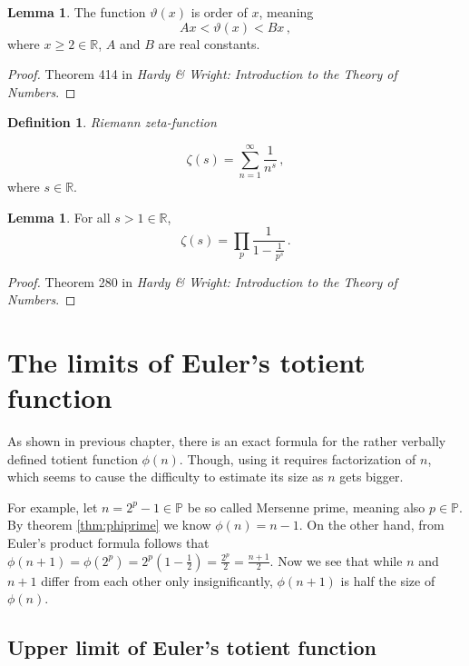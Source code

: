 \documentclass{article}
\theoremstyle{definition}
\newtheorem{definition}[subsubsection]{Definition}
\newtheorem{lemma}[subsubsection]{Lemma}
\begin{document}
\begin{lemma}
\label{lemma:vartheta}
The function $\vartheta(x)$ is order of $x$, meaning
\begin{equation*}
    Ax < \vartheta(x) < Bx\,,
\end{equation*}
where $x\geq2\in\mathbb{R}$, $A$ and $B$ are real constants.

\begin{proof}
Theorem 414 in \textit{Hardy \& Wright: Introduction to the Theory of Numbers}.
\end{proof}
\end{lemma}

\begin{definition}{\emph{Riemann zeta-function}}

\begin{equation*}
    \zeta(s)=\sum_{n=1}^\infty \frac{1}{n^s}\,,
\end{equation*}
where $s\in\mathbb{R}$.
\end{definition}

\begin{lemma}
For all $s>1\in\mathbb{R}$, 
\begin{equation*}
    \zeta(s)=\prod_p \frac{1}{1-\frac{1}{p^s}}\,.
\end{equation*}
\begin{proof}
Theorem 280 in \textit{Hardy \& Wright: Introduction to the Theory of Numbers}.
\end{proof}
\end{lemma}

\section{The limits of Euler's totient function}

As shown in previous chapter, there is an exact formula for the rather verbally defined totient function $\phi(n)$. Though, using it requires factorization of $n$, which seems to cause the difficulty to estimate its size as $n$ gets bigger.

For example, let $n = 2^p - 1 \in \mathbb{P}$ be so called Mersenne prime, meaning also $p \in \mathbb{P}$. By theorem \ref{thm:phiprime} we know $\phi(n) = n - 1$. On the other hand, from Euler's product formula follows that $\phi(n+1) = \phi(2^p) = 2^p(1-\frac{1}{2}) = \frac{2^p}{2} = \frac{n+1}{2}$. Now we see that while $n$ and $n+1$ differ from each other only insignificantly, $\phi(n+1)$ is half the size of $\phi(n)$.

\subsection{Upper limit of Euler's totient function}
\end{document}
